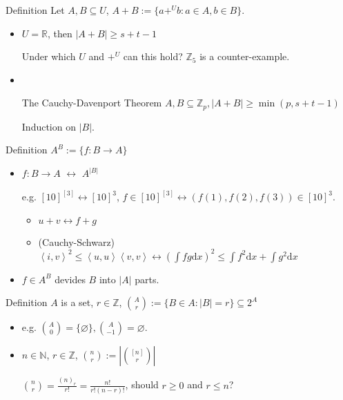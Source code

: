 \documentclass[UTF8, a4paper, linespread=1.5]{article}
\begin{document}
\begin{thm}{Definition}{}
    Let $A, B \subseteq U$, $A + B := \{a +^U b : a \in A, b \in B\} $.
\end{thm}

\begin{itemize}
    \item $U = \mathbb{R} $, then $|A + B| \ge s+t-1$

        Under which $U$ and $+^U$ can this hold? $\mathbb{Z} _5$ is a counter-example.
    \item ~ 
        \begin{thm}{The Cauchy-Davenport Theorem}{}
            $A, B \subseteq \mathbb{Z} _p, |A+B| \ge \min(p, s+t-1)$
        \end{thm}

        Induction on $|B|$.
\end{itemize}

\begin{thm}{Definition}{}
    $A^B := \{f: B \to A\} $
\end{thm}

\begin{itemize}
    \item 
        $f: B \to A$ $\leftrightarrow$ $A^{|B|}$

        e.g. $[10]^{[3]} \leftrightarrow [10]^3$, 
        $f \in [10]^{[3]} \leftrightarrow (f(1), f(2), f(3)) \in [10]^3$.

        \begin{itemize}
            \item 
                $u + v \leftrightarrow f + g$

            \item 
                (Cauchy-Schwarz)
                $\left<i, v \right>^2 \le  \left<u, u \right> \left<v, v \right> \leftrightarrow (\int fg \mathrm{d} x)^2 \le \int f^2 \mathrm{d} x + \int g^2 \mathrm{d} x$
        \end{itemize}
    \item 
        $f \in A^B$ devides $B$ into $|A|$ parts.
\end{itemize}

\begin{thm}{Definition}{}
    $A$ is a set, $r \in \mathbb{Z} $, $\displaystyle \binom A r := \{B \in A:  |B| = r\} \subseteq 2^A$ 
\end{thm}

\begin{itemize}
    \item e.g. $\displaystyle \binom A 0 = \{\varnothing\}, \binom A {-1} = \varnothing$.
    \item
        $n \in \mathbb{N}$, $r\in \mathbb{Z}$, $\displaystyle \binom n r := |\binom {[n]} r|$

        $\displaystyle \binom n r = \frac{(n)_r}{r!} = \frac{n!}{r!(n-r)!}$, should $r \ge 0$ and $r \le n$?
\end{itemize}
\end{document}
